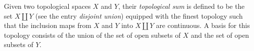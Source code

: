 \documentclass[12pt]{article}
\begin{document}
Given two topological spaces $X$ and $Y$, their \emph{topological sum} is defined 
to be the set $X \coprod Y$ (see the entry \emph{disjoint union}) equipped with 
the finest topology such that the inclusion maps from $X$ and $Y$ into $X \coprod Y$ 
are continuous.  A basis for this topology consists of the union of the set of 
open subsets of $X$ and the set of open subsets of $Y$.
\end{document}
